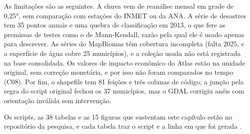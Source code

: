 As limitações são as seguintes. A chuva vem de reanálise mensal em grade de 0,25°, sem comparação com estações do INMET ou da ANA. A série de desastres tem 35 pontos anuais e uma quebra de classificação em 2013, o que fere as premissas de testes como o de Mann-Kendall, razão pela qual ele é usado apenas para descrever. As séries do MapBiomas têm cobertura incompleta (falta 2025, e a superfície de água cobre 25 municípios), e a coleção usada não está registrada na base consolidada. Os valores de impacto econômico do Atlas estão na unidade original, sem correção monetária, e por isso não foram comparados no tempo (C08). Por fim, o shapefile tem 81 feições e três colunas de código; a junção pela regra do script original fechou os 37 municípios, mas o GDAL corrigiu anéis com orientação inválida sem intervenção.

Os scripts, as 38 tabelas e as 15 figuras que sustentam este capítulo estão no repositório da pesquisa, e cada tabela traz o script e a linha em que foi gerada .